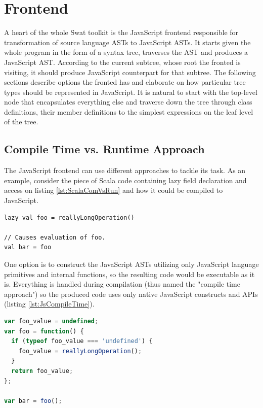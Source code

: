 \documentclass[12pt,a4paper]{report}
\begin{document}
\section{Frontend}

A heart of the whole Swat toolkit is the JavaScript frontend responsible for transformation of source language ASTs to JavaScript ASTs. It starts given the whole program in the form of a syntax tree, traverses the AST and produces a JavaScript AST. According to the current subtree, whose root the fronted is visiting, it should produce JavaScript counterpart for that subtree. The following sections describe options the fronted has and elaborate on how particular tree types should be represented in JavaScript. It is natural to start with the top-level node that encapsulates everything else and traverse down the tree through class definitions, their member definitions to the simplest expressions on the leaf level of the tree.

\subsection{Compile Time vs. Runtime Approach}

The JavaScript frontend can use different approaches to tackle its task. As an example, consider the piece of Scala code containing lazy field declaration and access on listing \ref{lst:ScalaComVsRun} and how it could be compiled to JavaScript.

\begin{lstlisting}[caption={Lazy field declaration and access.},label={lst:ScalaComVsRun}]
lazy val foo = reallyLongOperation()

// Causes evaluation of foo.
val bar = foo 
\end{lstlisting}

One option is to construct the JavaScript ASTs utilizing only JavaScript language primitives and internal functions, so the resulting code would be executable as it is. Everything is handled during compilation (thus named the "compile time approach") so the produced code uses only native JavaScript constructs and APIs (listing \ref{lst:JsCompileTime}).

\begin{lstlisting}[language=JavaScript,caption={Compile time option outcome.},label={lst:JsCompileTime}]
var foo_value = undefined;
var foo = function() {
  if (typeof foo_value === 'undefined') {
    foo_value = reallyLongOperation();
  }
  return foo_value;
};

var bar = foo();
\end{lstlisting} 
\end{document}

